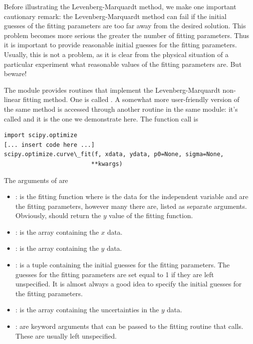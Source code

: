 \documentclass[letterpaper,10pt,english]{sphinxmanual}
\begin{document}
Before illustrating the Levenberg-Marquardt method, we make one important cautionary remark: the Levenberg-Marquardt method can fail if the initial guesses of the fitting parameters are too far away from the desired solution.  This problem becomes more serious the greater the number of fitting parameters.  Thus it is important to provide reasonable initial guesses for the fitting parameters.  Usually, this is not a problem, as it is clear from the physical situation of a particular experiment what reasonable values of the fitting parameters are.  But beware!

The  module provides routines that implement the Levenberg-Marquardt non-linear fitting method.  One is called .  A somewhat more user-friendly version of the same method is accessed through another routine in the same  module: it's called  and it is the one we demonstrate here.  The function call is

\begin{Verbatim}[commandchars=\\\{\}]
import scipy.optimize
[... insert code here ...]
scipy.optimize.curve\_fit(f, xdata, ydata, p0=None, sigma=None,
                         **kwargs)
\end{Verbatim}

The arguments of  are
\begin{itemize}
\item {} 
: is the fitting function where  is the data for the independent variable and  are the fitting parameters, however many there are, listed as separate arguments.  Obviously,  should return the $y$ value of the fitting function.

\item {} 
: is the array containing the $x$ data.

\item {} 
: is the array containing the $y$ data.

\item {} 
: is a tuple containing the initial guesses for the fitting parameters.  The guesses for the fitting parameters are set equal to 1 if they are left unspecified.  It is almost always a good idea to specify the initial guesses for the fitting parameters.

\item {} 
: is the array containing the uncertainties in the $y$ data.

\item {} 
: are keyword arguments that can be passed to the fitting routine  that  calls.  These are usually left unspecified.

\end{itemize}
\end{document}

